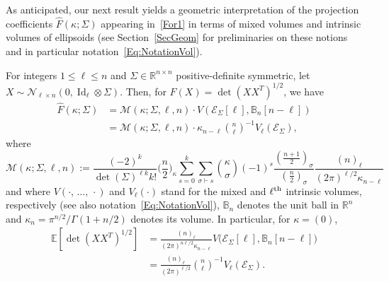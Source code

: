 \documentclass[AHL,Unicode,longabstracts,published]{cedram}
\DeclareMathOperator{\Id}{Id}
\newcommand{\scN}{\mathscr{N}}
\newcommand{\clM}{\mathcal{M}}
\newcommand{\clE}{\mathcal{E}}
\newcommand{\R}{\mathbb{R}}
\newcommand{\bbB}{\mathbb{B}}
\newcommand{\E}[1]{\mathbb{E}\left[#1\right]}
\begin{document}
As anticipated, our next result yields a geometric interpretation of the projection coefficients $\widehat{F}(\kappa;\Sigma)$ appearing in~\eqref{For1} in terms of mixed volumes and intrinsic volumes of ellipsoids (see Section~\ref{SecGeom} for preliminaries on these notions and in particular notation~\eqref{Eq:NotationVol}).

\begin{theo}\label{InterVol}
For integers $1\leq \ell \leq n$ and $\Sigma \in \R^{n\times n}$ positive-definite symmetric, let $X \sim \scN_{\ell \times n}(0,\Id_{\ell}\otimes \Sigma)$. Then, for $F(X)=\det(XX^T)^{1/2}$, we have
\begin{align}
\widehat{F}(\kappa;\Sigma) &=
\clM(\kappa;\Sigma, \ell,n)\cdot V(\clE_{\Sigma}[\ell],\bbB_n[n-\ell]) \label{For2}
\\
&= \clM(\kappa;\Sigma,\ell,n)\cdot
\kappa_{n-\ell}\binom{ n}{\ell}^{-1} V_{\ell}(\clE_{\Sigma}), \label{For3}
\end{align}
where
\[
\clM(\kappa;\Sigma, \ell,n):=
\frac{ (-2)^{k} }{\det(\Sigma)^{\ell k} k!}\bigg(\frac{n}{2}\bigg)_{\kappa}
\sum_{s=0}^{k} \sum_{\sigma \vdash s} \binom{\kappa}{\sigma} (-1)^s\frac{\left(\frac{n+1}{2}\right)_{\sigma}}{\left(\frac{n}{2}\right)_{\sigma}}
\frac{(n)_{\ell} }{(2\pi)^{\ell/2} \kappa_{n-\ell}}
\]
and where $V(\cdot,\,\ldots,\,\cdot)$ and $V_{\ell}(\cdot)$ stand for the mixed and $\ell^{\rm th}$ intrinsic volumes, respectively (see also notation~\eqref{Eq:NotationVol}), $\bbB_n$ denotes the unit ball in $\R^n$ and $\kappa_n=\pi^{n/2}/\Gamma(1+n/2)$ denotes its volume. In particular, for $\kappa=(0)$,
\begin{equation}\label{Kab}
\begin{split}
\E{\det\left(XX^T\right)^{1/2}} &=
\frac{(n)_{\ell}}{(2\pi)^{n\ell/2}\kappa_{n-\ell}}V\big(\clE_{\Sigma}[\ell],\bbB_n[n-\ell]\big)\\
&= \frac{(n)_{\ell} }{(2\pi)^{\ell/2} }\binom{ n}{\ell}^{-1} V_{\ell}(\clE_{\Sigma}).
\end{split}
\end{equation}
\end{theo}
\end{document}
